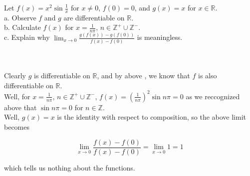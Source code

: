 Let $f(x)=x^2\sin{\frac{1}{x}}$ for $x\neq0$, $f(0)=0$, and $g(x)=x$ for $x\in\mathbb{R}$.\\

a. Observe $f$ and $g$ are differentiable on $\mathbb{R}$.\\

b. Calculate $f(x)$ for $x=\frac{1}{n\pi}$, $n\in\mathbb{Z^+}\cup\mathbb{Z^-}$.\\

c. Explain why $\lim_{x\rightarrow0}\frac{g(f(x))-g(f(0))}{f(x)-f(0)}$ is meaningless.\\\\

\begin{solution}\renewcommand{\qedsymbol}{}\ \\
    Clearly $g$ is differentiable on $\mathbb{R}$, and by above , we know that $f$ is also
    differentiable on $\mathbb{R}$.\\

    Well, for $x=\frac{1}{n\pi}$, $n\in\mathbb{Z^+}\cup\mathbb{Z^-}$,
    $f(x)=(\frac{1}{n\pi})^2\sin{n\pi}=0$ as we reccognized above that $\sin n\pi=0$ for
    $n\in\mathbb{Z}$.\\

    Well, $g(x)=x$ is the identity with respect to composition, so the above limit becomes
    
    $$\lim_{x\rightarrow0}\frac{f(x)-f(0)}{f(x)-f(0)}=\lim_{x\rightarrow0}1=1$$
    
    which tells us nothing about the functions.

\end{solution}